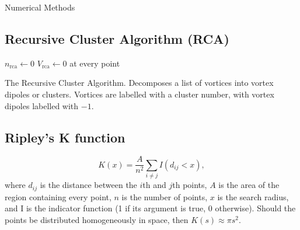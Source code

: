 \begin{chapter}{\label{cha:numerics}Numerical Methods}
	\subsection{\label{section:reevesalgorithm} Recursive Cluster Algorithm (RCA) }
		\begin{algorithm}[H]
		\BlankLine
		$n_{\mathrm{rca}}\leftarrow0$\;
		$V_{\mathrm{rca}}\leftarrow 0$ at every point\;

		\caption{The Recursive Cluster Algorithm. Decomposes a list of vortices into vortex dipoles or clusters. Vortices are labelled with a cluster number, with vortex dipoles labelled with $-1$.}\label{algo_rca
		}
		\end{algorithm}


	\subsection{\label{section:ripleysk} Ripley's K function }
		\begin{equation}\label{eq:ripleysk}
		K(x) = \frac{A}{n^2}\sum\limits_{i \ne j} I\left (d_{ij}<x\right ),
		\end{equation}
		where $d_{ij}$ is the distance between the $i$th and $j$th points, $A$ is the area of the region containing every point, $n$ is the number of points, $x$ is the search radius, and I is the indicator function (1 if its argument is true, 0 otherwise). Should the points be distributed homogeneously in space, then $K(s)\approx\pi s^2$.

\end{chapter}
